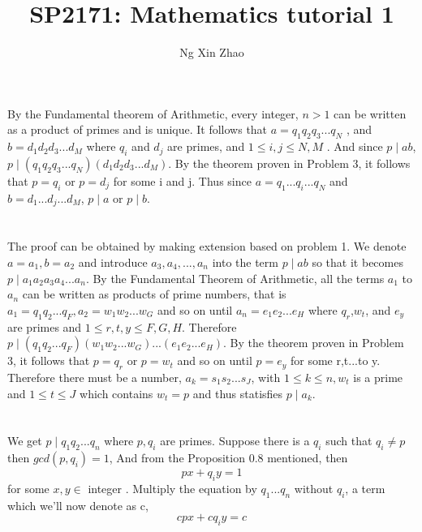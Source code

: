 \documentclass[a4paper,12pt]{article}
\title{SP2171: Mathematics tutorial 1}
\author{Ng Xin Zhao}
\begin{document}
\maketitle


\section{}
By the Fundamental theorem of Arithmetic, every integer, $n>1$ can be written as a product of primes and is unique. It follows that $a=q_{1}q_{2}q_{3}...q_{N}$ , and $b=d_{1}d_{2}d_{3}...d_{M}$ where $q_{i}$ and $d_{j}$ are primes, and $1\leq i,j\leq N,M$ . And since $p\mid ab$, $p \mid (q_{1}q_{2}q_{3}...q_{N})(d_{1}d_{2}d_{3}...d_{M})$. By the theorem proven in Problem 3, it follows that $p=q_{i}$ or $p=d_{j}$ for some i and j. Thus since $a=q_1...q_i...q_{N}$ and $b=d_1...d_j...d_{M}$, $p \mid a$ or $p \mid b$.

\section{}
The proof can be obtained by making extension based on problem 1. We denote $a=a_1, b=a_2$ and introduce $a_3, a_4,...,a_n$ into the term $p \mid ab$ so that it becomes $p \mid a_1a_2a_3a_4...a_n$. By the Fundamental Theorem of Arithmetic, all the terms $a_1$ to $a_n$ can be written as products of prime numbers, that is $a_1=q_1q_2...q_F, a_2=w_1w_2...w_G$ and so on until $a_n=e_1e_2...e_H$ where $q_r$,$w_t$, and $e_y$ are primes and $1\leq r,t,y\leq F,G,H$. Therefore $p \mid (q_1q_2...q_F)(w_1w_2...w_G)...(e_1e_2...e_H)$. By the theorem proven in Problem 3, it follows that $p=q_{r}$ or $p=w_{t}$ and so on until $p=e_y$ for some r,t...to y. Therefore there must be a number, $a_k=s_1s_2...s_J$, with $1\leq k\leq n, w_t$ is a prime and $1\leq t\leq J$ which contains $w_t=p$ and thus statisfies $p \mid a_k$.

\section{}
We get $p \mid q_1q_2...q_n$ where $p,q_i$ are primes. Suppose there is a $q_i$ such that $q_i\neq p$ then $gcd(p,q_i)=1$, And from the Proposition 0.8 mentioned, then
\begin{equation} px+q_iy=1 \end {equation} for some $x,y\in$ integer . Multiply the equation by $q_1...q_n$ without $q_i$, a term which we'll now denote as c, \begin{equation} cpx+cq_iy=c \end{equation}
\end{document}
